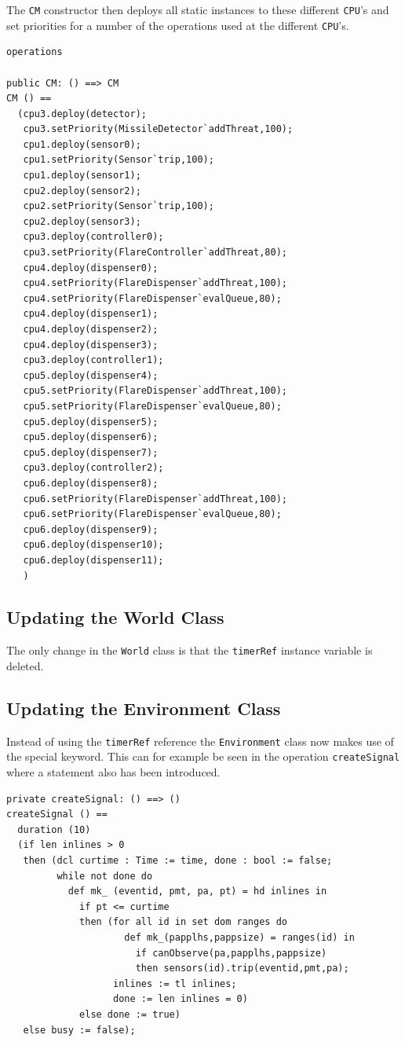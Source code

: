 \documentclass{overturerepchap}
\begin{document}
The \texttt{CM} constructor then deploys all static instances to these
different \texttt{CPU}'s and set priorities for a number of the operations
used at the different \texttt{CPU}'s.

\begin{lstlisting}
operations

public CM: () ==> CM
CM () ==
  (cpu3.deploy(detector);
   cpu3.setPriority(MissileDetector`addThreat,100);
   cpu1.deploy(sensor0);
   cpu1.setPriority(Sensor`trip,100);
   cpu1.deploy(sensor1);
   cpu2.deploy(sensor2);
   cpu2.setPriority(Sensor`trip,100);
   cpu2.deploy(sensor3);
   cpu3.deploy(controller0);
   cpu3.setPriority(FlareController`addThreat,80);
   cpu4.deploy(dispenser0);
   cpu4.setPriority(FlareDispenser`addThreat,100);
   cpu4.setPriority(FlareDispenser`evalQueue,80);
   cpu4.deploy(dispenser1);
   cpu4.deploy(dispenser2);
   cpu4.deploy(dispenser3);
   cpu3.deploy(controller1);
   cpu5.deploy(dispenser4);
   cpu5.setPriority(FlareDispenser`addThreat,100);
   cpu5.setPriority(FlareDispenser`evalQueue,80);
   cpu5.deploy(dispenser5);
   cpu5.deploy(dispenser6);
   cpu5.deploy(dispenser7);
   cpu3.deploy(controller2);
   cpu6.deploy(dispenser8);
   cpu6.setPriority(FlareDispenser`addThreat,100);
   cpu6.setPriority(FlareDispenser`evalQueue,80);
   cpu6.deploy(dispenser9);
   cpu6.deploy(dispenser10);
   cpu6.deploy(dispenser11);
   )
\end{lstlisting}

\subsection{Updating the World Class}

The only change in the \texttt{World} class is that the \texttt{timerRef}
instance variable is deleted.

\subsection{Updating the Environment Class}

Instead of using the \texttt{timerRef} reference the
\texttt{Environment} class now makes use of the special {\bf{}}
keyword. This can for example be seen in the operation
\texttt{createSignal} where a {\bf{}} statement also has
been introduced.

\begin{lstlisting}
private createSignal: () ==> ()
createSignal () ==
  duration (10) 
  (if len inlines > 0
   then (dcl curtime : Time := time, done : bool := false;
         while not done do
           def mk_ (eventid, pmt, pa, pt) = hd inlines in
             if pt <= curtime
             then (for all id in set dom ranges do
                     def mk_(papplhs,pappsize) = ranges(id) in
                       if canObserve(pa,papplhs,pappsize)
                       then sensors(id).trip(eventid,pmt,pa);
                   inlines := tl inlines;
                   done := len inlines = 0)
             else done := true)
   else busy := false);
\end{lstlisting}
\end{document}
